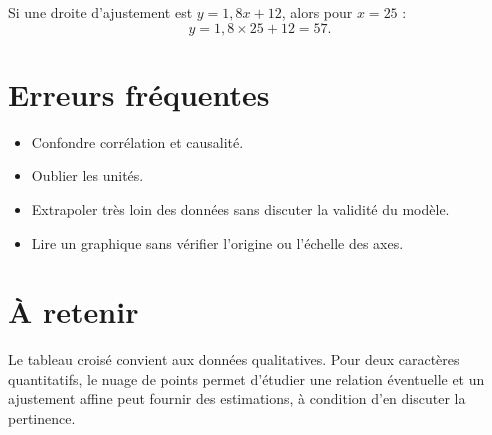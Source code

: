 Si une droite d'ajustement est $y=1{,}8x+12$, alors pour $x=25$ :
\[
y=1{,}8\times25+12=57.
\]

\section{Erreurs fréquentes}
\begin{itemize}
\item Confondre corrélation et causalité.
\item Oublier les unités.
\item Extrapoler très loin des données sans discuter la validité du modèle.
\item Lire un graphique sans vérifier l'origine ou l'échelle des axes.
\end{itemize}

\section{À retenir}
Le tableau croisé convient aux données qualitatives. Pour deux caractères quantitatifs, le nuage de points permet d'étudier une relation éventuelle et un ajustement affine peut fournir des estimations, à condition d'en discuter la pertinence.
